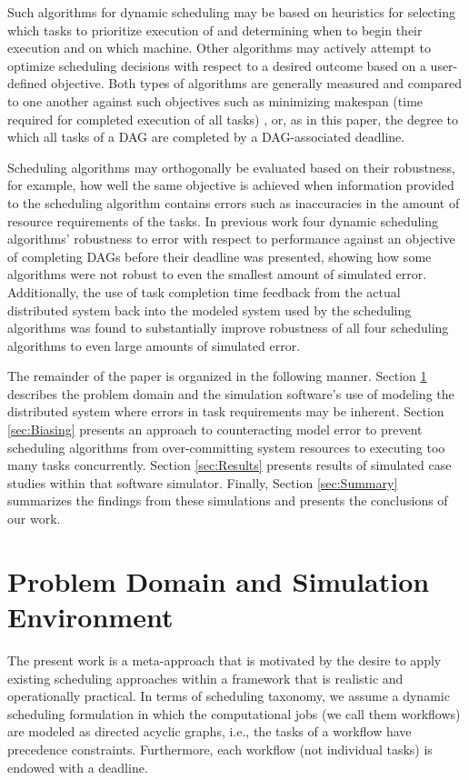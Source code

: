 \documentclass[10pt]{csce}
\begin{document}
Such algorithms for dynamic scheduling may be based on heuristics for selecting
which tasks to prioritize execution of and determining when to begin their
execution and on which machine. Other algorithms may actively attempt to
optimize scheduling decisions with respect to a desired outcome based on a
user-defined objective.  Both types of algorithms are generally measured
and compared to one another against such objectives such as minimizing makespan
(time required for completed execution of all tasks) \cite{stochastic}, or, as
in this paper, the degree to which all tasks of a DAG are completed by a
DAG-associated deadline.

Scheduling algorithms may orthogonally be evaluated based on their robustness,
for example, how well the same objective is achieved when information provided
to the scheduling algorithm contains errors such as inaccuracies in the
amount of resource requirements of the tasks.  In previous work \cite{pdpta18}
four dynamic scheduling algorithms' robustness to error with respect to
performance against an objective of completing DAGs before their deadline was
presented, showing how some algorithms were not robust to even the smallest
amount of simulated error.  Additionally, the use of task completion time
feedback from the actual distributed system back into the modeled system used
by the scheduling algorithms was found to substantially improve robustness of
all four scheduling algorithms to even large amounts of simulated error.

The remainder of the paper is organized in the following manner.  Section
\ref{sec:Framework} describes the problem domain and the simulation software's
use of modeling the distributed system where errors in task requirements may
be inherent.  Section \ref{sec:Biasing} presents an approach to counteracting
model error to prevent scheduling algorithms from over-committing system
resources to executing too many tasks concurrently. Section \ref{sec:Results}
presents results of simulated case studies within that software simulator.
Finally, Section \ref{sec:Summary} summarizes the findings from these
simulations and presents the conclusions of our work.


\section{Problem Domain and Simulation Environment}
\label{sec:Framework}

The present work is a meta-approach that is motivated by the desire to apply
existing scheduling approaches within a framework that is realistic and
operationally practical.  In terms of scheduling taxonomy, we assume a dynamic
scheduling formulation in which the computational jobs (we call them workflows)
are modeled as directed acyclic graphs, i.e., the tasks of a workflow have
precedence constraints.  Furthermore, each workflow (not individual tasks) is
endowed with a deadline. 
\end{document}
